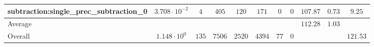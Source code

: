 \begin{tabular}{|l|c|c|c|c|c|c|c|c|c|c|}
subtraction:single\_prec\_subtraction\_0         & $ 3.708 \cdot 10^{-2} $ & $ 4      $ & $ 405  $ & $ 120  $ & $ 171   $ & $ 0  $ & $ 0 $ & $ 107.87      $ & $ 0.73    $ & $ 9.25    $ \\
\hline
Average                                          & $                     $ & $        $ & $      $ & $      $ & $       $ & $    $ & $   $ & $ 112.28      $ & $ 1.03    $ & $         $ \\
\hline
Overall                                          & $ 1.148 \cdot 10^{0}  $ & $ 135    $ & $ 7506 $ & $ 2520 $ & $ 4394  $ & $ 77 $ & $ 0 $ & $             $ & $         $ & $ 121.53  $ \\
\hline
\end{tabular}
